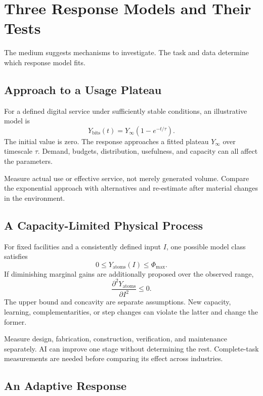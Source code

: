 \documentclass[11pt,openany]{book}
\begin{document}
\section{Three Response Models and Their Tests}

The medium suggests mechanisms to investigate. The task and data determine which response model fits.

\subsection{Approach to a Usage Plateau}

For a defined digital service under sufficiently stable conditions, an illustrative model is
\begin{equation}
 Y_{\mathrm{bits}}(t)=Y_\infty(1-e^{-t/\tau}).
\end{equation}
The initial value is zero. The response approaches a fitted plateau $Y_\infty$ over timescale $\tau$. Demand, budgets, distribution, usefulness, and capacity can all affect the parameters.

Measure actual use or effective service, not merely generated volume. Compare the exponential approach with alternatives and re-estimate after material changes in the environment.

\subsection{A Capacity-Limited Physical Process}

For fixed facilities and a consistently defined input $I$, one possible model class satisfies
\begin{equation}
 0\leq Y_{\mathrm{atoms}}(I)\leq\Phi_{\max}.
\end{equation}
If diminishing marginal gains are additionally proposed over the observed range,
\begin{equation}
 \frac{\partial^2Y_{\mathrm{atoms}}}{\partial I^2}\leq0.
\end{equation}
The upper bound and concavity are separate assumptions. New capacity, learning, complementarities, or step changes can violate the latter and change the former.

Measure design, fabrication, construction, verification, and maintenance separately. AI can improve one stage without determining the rest. Complete-task measurements are needed before comparing its effect across industries.

\subsection{An Adaptive Response}
\end{document}
